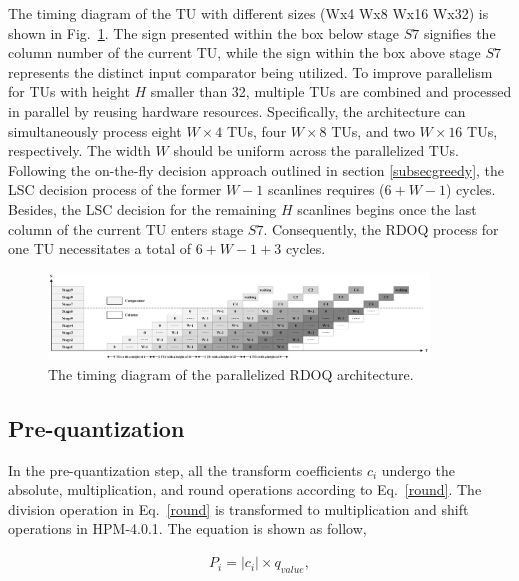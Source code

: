 \documentclass[lettersize,journal]{IEEEtran}
\begin{document}
The timing diagram of the TU with different sizes (Wx4 Wx8 Wx16 Wx32) is shown in Fig.~\ref{timing diagram}. The sign presented within the box below stage $S7$ signifies the column number of the current TU, while the sign within the box above stage $S7$ represents the distinct input comparator being utilized. 
To improve parallelism for TUs with height $H$ smaller than 32, multiple TUs are combined and processed in parallel by reusing hardware resources. Specifically, the architecture can simultaneously process eight $W\times4$ TUs, four $W\times8$ TUs, and two $W\times16$ TUs, respectively. The width $W$ should be uniform across the parallelized TUs.
Following the on-the-fly decision approach outlined in section \ref{subsecgreedy}, the LSC decision process of the former $W-1$ scanlines requires ($6 + W - 1$) cycles. Besides, the LSC decision for the remaining $H$ scanlines begins once the last column of the current TU enters stage $S7$. Consequently, the RDOQ process for one TU necessitates a total of $6 + W - 1 + 3$ cycles.


\par
\begin{figure}[htbp]
	\centering
	\centerline{\includegraphics[width=0.90\textwidth]{pic_pan/timing diagram.png}} 
	\caption{The timing diagram of the parallelized RDOQ architecture.}
	\label{timing diagram} %
\end{figure}

\subsection{Pre-quantization}
In the pre-quantization step, all the transform coefficients $c_{i}$ undergo the absolute, multiplication, and round operations according to Eq.~\eqref{round}. The division operation in Eq.~\eqref{round} is transformed to multiplication and shift operations in HPM-4.0.1. The equation is shown as follow,

\begin{equation}\label{Qp}
	\begin{aligned}
		P_{i} = \lvert c_{i} \rvert \times q_{value},
	\end{aligned}
\end{equation}
\end{document}
